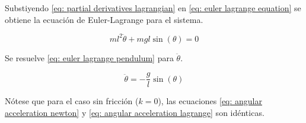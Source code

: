 Substiyendo \eqref{eq: partial derivatives lagrangian} 
en \eqref{eq: euler lagrange equation}
se obtiene la ecuación de Euler-Lagrange para el sistema.

\begin{equation}
 ml^2\ddot{\theta} + m g l \sin(\theta) = 0
 \label{eq: euler lagrange pendulum}
\end{equation}

Se resuelve \eqref{eq: euler lagrange pendulum} para $\ddot{\theta}$.

\begin{equation}
 \ddot{\theta} = - \dfrac{g}{l} \sin (\theta)
 \label{eq: angular acceleration lagrange}
\end{equation}


Nótese que para el caso sin fricción ($k = 0$), las ecuaciones 
\eqref{eq: angular acceleration newton} y 
\eqref{eq: angular acceleration lagrange}
son idénticas.
